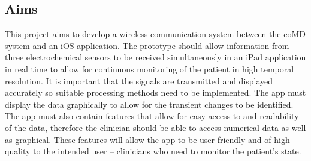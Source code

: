 \subsection{Aims}
This project aims to develop a wireless communication system between the coMD system and an iOS application. The prototype should allow information from three electrochemical sensors to be received simultaneously in an iPad application in real time to allow for continuous monitoring of the patient in high temporal resolution. It is important that the signals are transmitted and displayed accurately so suitable processing methods need to be implemented. The app must display the data graphically to allow for the transient changes to be identified. The app must also contain features that allow for easy access to and readability of the data, therefore the clinician should be able to access numerical data as well as graphical. These features will allow the app to be user friendly and of high quality to the intended user -- clinicians who need to monitor the patient's state.